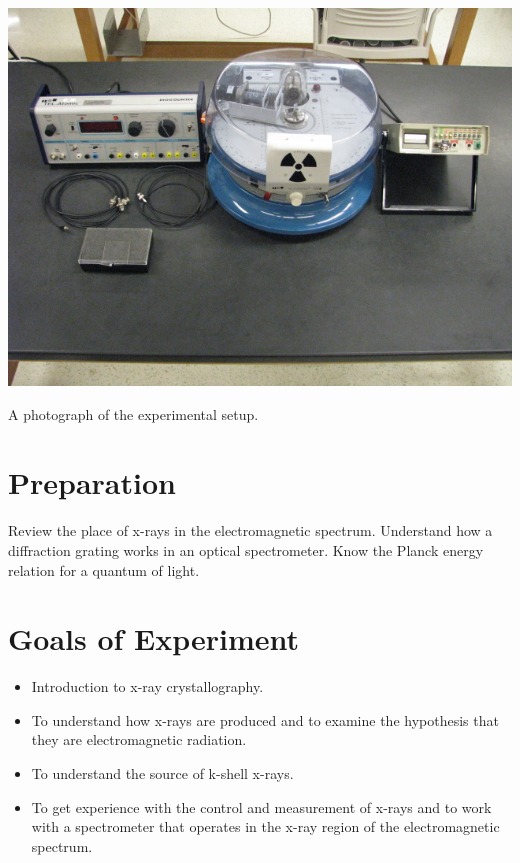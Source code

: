 \begin{marginfigure}[+1.5in]
\includegraphics{X-Ray-Diffraction-Setup.jpg}
\caption{A photograph of the experimental setup.}
\label{fig:XRsetup}
\end{marginfigure}

\section{Preparation}
Review the place of x-rays in the electromagnetic spectrum. Understand how a diffraction grating works in an optical spectrometer. Know the Planck energy relation for a quantum of light.

\section{Goals of Experiment}
\begin{itemize}
\item Introduction to x-ray crystallography.
    \item To understand how x-rays are produced and to examine the hypothesis that they are electromagnetic radiation.
    \item To understand the source of k-shell x-rays.
    \item To get experience with the control and measurement of x-rays and to work with a spectrometer that operates in the x-ray region of the electromagnetic spectrum.
\end{itemize}

